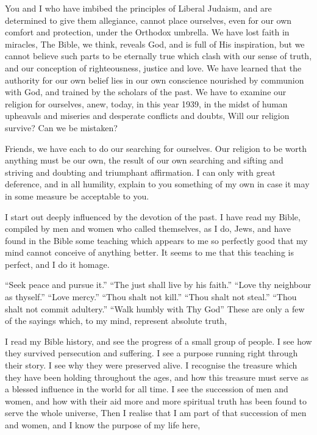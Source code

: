 You and I who have imbibed the principles of Liberal
Judaism, and are determined to give them allegiance, cannot
place ourselves, even for our own comfort and protection,
under the Orthodox umbrella. We have lost faith in
miracles, The Bible, we think, reveals God, and is full of
His inspiration, but we cannot believe such parts to be
eternally true which clash with our sense of truth, and our
conception of righteousness, justice and love. We have
learned that the authority for our own belief lies in our
own conscience nourished by communion with God, and trained
by the scholars of the past. We have to examine our religion
for ourselves, anew, today, in this year 1939, in the
midst of human upheavals and miseries and desperate
conflicts and doubts, Will our religion survive? Can we
be mistaken?

Friends, we have each to do our searching for
ourselves. Our religion to be worth anything must be our
own, the result of our own searching and sifting and
striving and doubting and triumphant affirmation. I can
only with great deference, and in all humility, explain to
you something of my own in case it may in some measure be
acceptable to you.

I start out deeply influenced by the devotion of the
past. I have read my Bible, compiled by men and women who
called themselves, as I do, Jews, and have found in the
Bible some teaching which appears to me so perfectly good
that my mind cannot conceive of anything better. It seems
to me that this teaching is perfect, and I do it homage.

``Seek peace and pursue it.'' ``The just shall live by his
faith.'' ``Love thy neighbour as thyself.'' ``Love mercy.''
``Thou shalt not kill.'' ``Thou shalt not steal.'' ``Thou
shalt not commit adultery.'' ``Walk humbly with Thy God''
These are only a few of the sayings which, to my mind,
represent absolute truth,

I read my Bible history, and see the progress of a
small group of people. I see how they survived persecution
and suffering. I see a purpose running right through their
story. I see why they were preserved alive. I recognise
the treasure which they have been holding throughout the
ages, and how this treasure must serve as a blessed
influence in the world for all time. I see the succession
of men and women, and how with their aid more and more
spiritual truth has been found to serve the whole universe,
Then I realise that I am part of that succession of men and
women, and I know the purpose of my life here,

